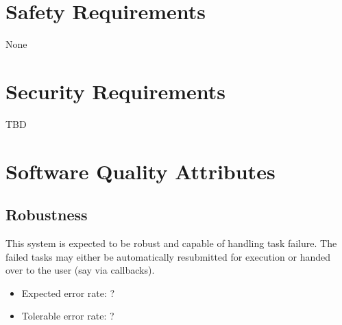 \documentclass{scrreprt}
\begin{document}
\section{Safety Requirements}
None

\section{Security Requirements}
TBD

\section{Software Quality Attributes}

\subsection{Robustness}

This system is expected to be robust and capable of handling task failure. The failed tasks may either be automatically resubmitted for execution or handed over to the user (say via callbacks). 

\begin{itemize}[noitemsep]
\item Expected error rate: ?
\item Tolerable error rate: ?
\end{itemize}
\end{document}
